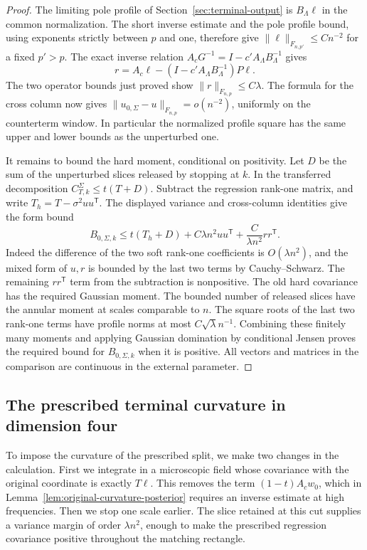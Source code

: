 \documentclass[11pt]{article}
\theoremstyle{definition}
\begin{document}
\begin{proof}
The limiting pole profile of Section~\ref{sec:terminal-output}
is \(B_\Lambda\ell\) in the common normalization.
The short inverse estimate and the pole profile bound,
using exponents strictly between \(p\) and one, therefore
give \(\|\ell\|_{F_{n,p'}}\le Cn^{-2}\) for a fixed
\(p'>p\). The exact inverse relation
\(A_cG^{-1}=I-c' A_\Lambda B_\Lambda^{-1}\) gives
\begin{equation}
 r=A_c\ell-(I-c' A_\Lambda B_\Lambda^{-1})P\ell .
\end{equation}
The two operator bounds just proved show \(\|r\|_{F_{n,p}}\le C\lambda\).
The formula for the cross column now gives
\(\|u_{0,\Sigma}-u\|_{F_{n,p}}=o(n^{-2})\), uniformly on
the counterterm window. In particular the normalized
profile square has the same upper and lower bounds as the
unperturbed one.

It remains to bound the hard moment, conditional on positivity.
Let \(D\) be the sum of the unperturbed slices released by
stopping at \(k\). In the transferred decomposition
\(C^\Sigma_{T,k}\le t(T+D)\). Subtract the regression rank-one
matrix, and write \(T_h=T-\sigma^2 uu^{\mathsf T}\).
The displayed variance and cross-column identities give
the form bound
\begin{equation}
 B_{0,\Sigma,k}
 \le t(T_h+D)+C\lambda n^2 uu^{\mathsf T}
                          +\frac{C}{\lambda n^2}rr^{\mathsf T}.
\end{equation}
Indeed the difference of the two soft rank-one coefficients
is \(O(\lambda n^2)\), and the mixed form of \(u,r\) is bounded
by the last two terms by Cauchy--Schwarz. The remaining
\(rr^{\mathsf T}\) term from the subtraction is nonpositive.
The old hard covariance has the required Gaussian moment.
The bounded number of released slices have the annular moment
at scales comparable to \(n\). The square roots of the last
two rank-one terms have profile norms at most
\(C\sqrt\lambda n^{-1}\). Combining these finitely many
moments and applying Gaussian domination by conditional
Jensen proves the required bound for \(B_{0,\Sigma,k}\)
when it is positive. All vectors and matrices in the
comparison are continuous in the external parameter.
\end{proof}

\subsection{The prescribed terminal curvature in dimension four}
\label{sec:d4-prescribed}

To impose the curvature of the prescribed split, we make two
changes in the calculation. First we integrate in a microscopic
field whose covariance with the original coordinate is exactly
\(T\ell\). This removes the term \((1-t)A_cw_0\), which in
Lemma~\ref{lem:original-curvature-posterior} requires an inverse
estimate at high frequencies. Then we stop one scale earlier. The
slice retained at this cut supplies a variance margin of order
\(\lambda n^2\), enough to make the prescribed regression covariance
positive throughout the matching rectangle.
\end{document}
